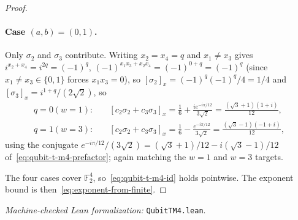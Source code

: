 \documentclass[11pt]{article}
\theoremstyle{definition}
\newcommand{\F}{\mathcal{F}}
\renewcommand{\F}[1]{\mathbb{F}_{#1}}
\begin{document}
\begin{proof}
		\paragraph{Case $(a, b) = (0, 1)$.}
		Only $\sigma_2$ and $\sigma_3$ contribute. Writing
		$x_2 = x_4 = q$ and $x_1 \ne x_3$ gives
		$i^{x_2 + x_4} = i^{2q} = (-1)^q$,
		$(-1)^{x_1 x_3 + x_2 x_4} = (-1)^{0 + q} = (-1)^q$ (since
		$x_1 \ne x_3 \in \{0, 1\}$ forces $x_1 x_3 = 0$), so
		$[\sigma_2]_x = (-1)^q (-1)^q / 4 = 1/4$ and
		$[\sigma_3]_x = i^{1 + q} / (2\sqrt 2)$, so
		\begin{align}
			q = 0 (w = 1):\quad &
			[c_2 \sigma_2 + c_3 \sigma_3]_x
			= \frac{1}{6} + \frac{i e^{-i \pi / 12}}{3\sqrt 2}
			= \frac{(\sqrt 3 + 1)(1 + i)}{12},\\
			q = 1 (w = 3):\quad &
			[c_2 \sigma_2 + c_3 \sigma_3]_x
			= \frac{1}{6} - \frac{e^{-i \pi / 12}}{3\sqrt 2}
			= \frac{(\sqrt 3 - 1)(-1 + i)}{12},
		\end{align}
		using the conjugate
		$e^{-i \pi / 12} / (3\sqrt 2) = (\sqrt 3 + 1)/12 - i (\sqrt 3 - 1)/12$
		of~\eqref{eq:qubit-t-m4-prefactor}; again matching the
		$w = 1$ and $w = 3$ targets.

		The four cases cover $\F{2}^4$, so~\eqref{eq:qubit-t-m4-id}
		holds pointwise. The exponent bound is
		then~\eqref{eq:exponent-from-finite}.
	\end{proof}

	\textit{Machine-checked Lean formalization:}
	\texttt{QubitTM4.lean}.
	
\end{document}
